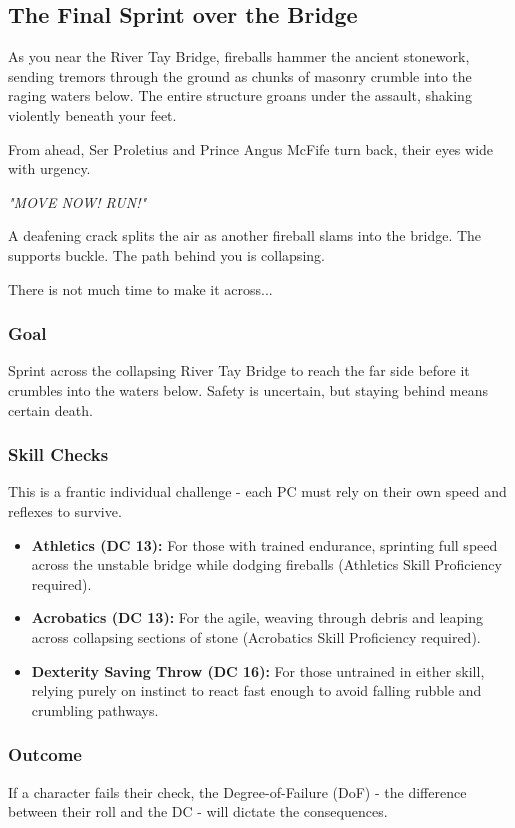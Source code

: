 \subsection*{The Final Sprint over the Bridge}
\begin{DndReadAloud}
	As you near the River Tay Bridge, fireballs hammer the ancient stonework, sending tremors through the ground as chunks of masonry crumble into the raging waters below. The entire structure groans under the assault, shaking violently beneath your feet.

	From ahead, Ser Proletius and Prince Angus McFife turn back, their eyes wide with urgency.

	\textit{"MOVE NOW! RUN!"}

	A deafening crack splits the air as another fireball slams into the bridge. The supports buckle. The path behind you is collapsing.

	There is not much time to make it across...
\end{DndReadAloud}
\subsubsection*{Goal}
{\entryfont Sprint across the collapsing River Tay Bridge to reach the far side before it crumbles into the waters below. Safety is uncertain, but staying behind means certain death.}
\subsubsection*{Skill Checks}
{\entryfont This is a frantic individual challenge - each PC must rely on their own speed and reflexes to survive.
\begin{itemize}
	\renewcommand\labelitemi{\textbf{\textbullet}}
	\item \textbf{Athletics (DC 13):} For those with trained endurance, sprinting full speed across the unstable bridge while dodging fireballs (Athletics Skill Proficiency required).
	\item \textbf{Acrobatics (DC 13):} For the agile, weaving through debris and leaping across collapsing sections of stone (Acrobatics Skill Proficiency required).
	\item \textbf{Dexterity Saving Throw (DC 16):} For those untrained in either skill, relying purely on instinct to react fast enough to avoid falling rubble and crumbling pathways.
\end{itemize}}
\vfill\eject
\subsubsection*{Outcome}
{\entryfont If a character fails their check, the Degree-of-Failure (DoF) - the difference between their roll and the DC - will dictate the consequences.}
